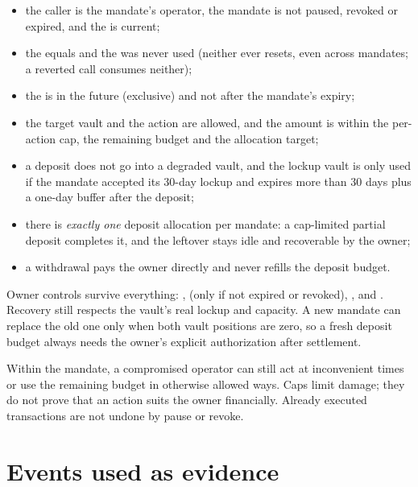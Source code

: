 \begin{itemize}
  \item the caller is the mandate's operator, the mandate is not paused, revoked or expired, and the  is current;
  \item the  equals  and the  was never used (neither ever resets, even across mandates; a reverted call consumes neither);
  \item the  is in the future (exclusive) and not after the mandate's expiry;
  \item the target vault and the action are allowed, and the amount is within the per-action cap, the remaining budget and the allocation target;
  \item a deposit does not go into a degraded vault, and the lockup vault is only used if the mandate accepted its 30-day lockup and expires more than 30 days plus a one-day buffer after the deposit;
  \item there is \emph{exactly one} deposit allocation per mandate: a cap-limited partial deposit completes it, and the leftover stays idle and recoverable by the owner;
  \item a withdrawal pays the owner directly and never refills the deposit budget.
\end{itemize}

Owner controls survive everything: ,  (only if not expired or revoked), ,  and . Recovery still respects the vault's real lockup and capacity. A new mandate can replace the old one only when both vault positions are zero, so a fresh deposit budget always needs the owner's explicit authorization after settlement.

\begin{caution}
Within the mandate, a compromised operator can still act at inconvenient times or use the remaining budget in otherwise allowed ways. Caps limit damage; they do not prove that an action suits the owner financially. Already executed transactions are not undone by pause or revoke.
\end{caution}

\section{Events used as evidence}

